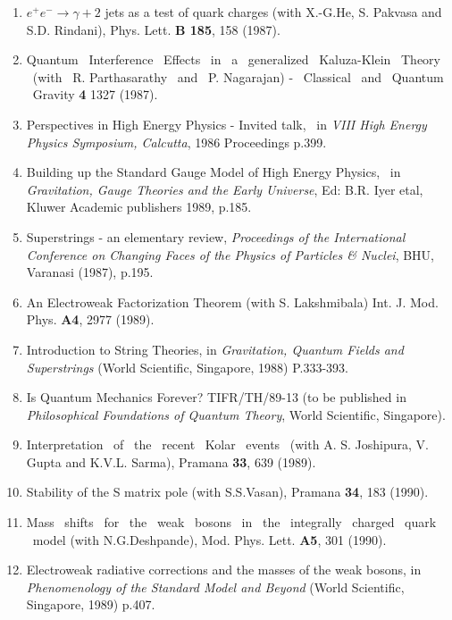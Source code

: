 \begin{enumerate}
\item $e^+e^- \rightarrow \gamma + 2$ jets as a test of quark charges
(with X.-G.He, S. Pakvasa and S.D. Rindani), Phys. Lett. {\bf B 185}, 
158 (1987).

\item Quantum \ Interference \ Effects \ in \ a \ generalized \ Kaluza-Klein \
Theory
\ (with \ R. Parthasarathy \ and \ P. Nagarajan) - \ Classical \ and \ Quantum \ Gravity
{\bf 4} 1327 (1987).

\item Perspectives in High Energy Physics - Invited talk, \ in {\it VIII High
Energy Physics Symposium, Calcutta}, 1986 Procee\-dings p.399.

\item Building up the Standard Gauge Model of High Energy Phy\-sics, \ in
{\it Gravitation, Gauge Theories and the Early Universe}, Ed: B.R. Iyer etal, 
Kluwer Academic publishers 1989, p.185.

\item Superstrings - an elementary review, {\it Proceedings of the
International Conference on Changing Faces of the Physics of Particles \&
Nuclei}, BHU, Varanasi (1987), p.195.

\item An Electroweak Factorization Theorem (with S. Lakshmiba\-la)
Int. J. Mod. Phys. {\bf A4}, 2977 (1989).

\item Introduction to String Theories, in {\it Gravitation, Quantum
Fie\-lds and Superstrings} (World Scientific, Singapore, 1988) P.333-393.

\item Is Quantum Mechanics Forever? TIFR/TH/89-13 (to be pu\-blished
in {\it Philosophical Foundations of Quantum Theory}, Wo\-rld Scientific, 
Singapore).

\item Interpretation \ of \ the \ recent \ Kolar \ events \ (with
A. S. Joshipura, V. Gupta and K.V.L. Sarma), Pramana {\bf 33}, 639 (1989).

\item Stability of the S matrix pole (with S.S.Vasan), Pramana {\bf
34}, 183 (1990).

\item Mass \ shifts \ for \ the \ weak \ bosons \ in \ the \ integrally \
charged \ quark \ model (with N.G.Deshpande), Mod. Phys. Lett. {\bf A5}, 301 (1990).

\item Electroweak radiative corrections and the masses of the weak
bosons, in {\it Phenomenology of the Standard Model and Beyond} (World
Scientific, Singapore, 1989) p.407.


\end{enumerate}
